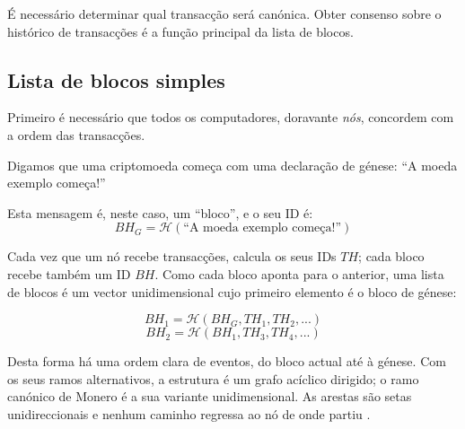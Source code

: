 É necessário determinar qual transacção será canónica. Obter consenso sobre o
histórico de transacções é a função principal da lista
de blocos.



\subsection{Lista de blocos simples}
\label{subsec:simple-blockchain}


Primeiro é necessário que todos os computadores, doravante \emph{nós},
concordem com a ordem das transacções.


Digamos que uma criptomoeda começa com uma declaração de génese:
``A moeda exemplo começa!''

Esta mensagem é, neste caso, um ``bloco'', e o seu ID é:
\vspace{.175cm}
\[\mathit{BH}_G = \mathcal{H}(\textrm{``A moeda exemplo começa!''})\]

Cada vez que um nó recebe transacções, calcula os seus IDs $\mathit{TH}$; cada
bloco recebe também um ID $\mathit{BH}$. Como cada bloco aponta para o anterior,
uma lista de blocos é um vector unidimensional cujo primeiro elemento é o
bloco de génese:


\vspace{.175cm}
\[\mathit{BH}_1 = \mathcal{H}(\mathit{BH}_G, \mathit{TH}_1, \mathit{TH}_2,...)\]
\[\mathit{BH}_2 = \mathcal{H}(\mathit{BH}_1, \mathit{TH}_3, \mathit{TH}_4,...)\]

Desta forma há uma ordem clara de eventos, do bloco actual até à génese. Com
os seus ramos alternativos, a estrutura é um grafo acíclico dirigido; o ramo
canónico de Monero é a sua variante unidimensional. As arestas são setas
unidireccionais e nenhum caminho regressa ao nó de onde partiu
\cite{DAG-wikipedia}.

